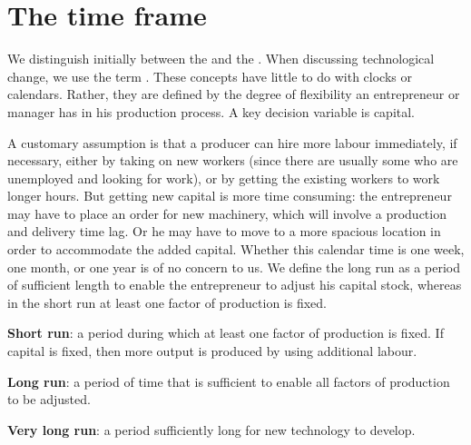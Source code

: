 \section{The time frame}\label{sec:ch8sec2}

We distinguish initially between the  and the . When discussing technological change, we use the term . These concepts have little to do with clocks or calendars. Rather, they are defined by the degree of flexibility an entrepreneur or manager has in his production process. A key decision variable is capital.

A customary assumption is that a producer can hire more labour immediately, if necessary, either by taking on new workers (since there are usually some who are unemployed and looking for work), or by getting the existing workers to work longer hours. But getting new capital is more time consuming: the entrepreneur may have to place an order for new machinery, which will involve a production and delivery time lag. Or he may have to move to a more spacious location in order to accommodate the added capital. Whether this calendar time is one week, one month, or one year is of no concern to us. We define the long run as a period of sufficient length to enable the entrepreneur to adjust his capital stock, whereas in the short run at least one factor of production is fixed.

\begin{DefBox}
\textbf{Short run}: a period during which at least one factor of production is fixed. If capital is fixed, then more output is produced by using additional labour.

\textbf{Long run}: a period of time that is sufficient to enable all factors of production to be adjusted.

\textbf{Very long run}: a period sufficiently long for new technology to develop.
\end{DefBox}